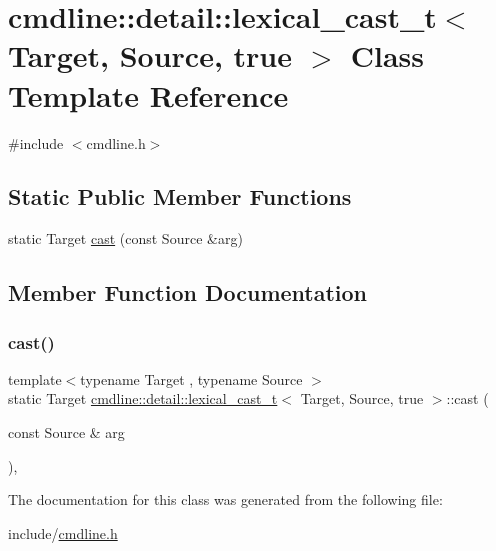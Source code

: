 \hypertarget{classcmdline_1_1detail_1_1lexical__cast__t_3_01_target_00_01_source_00_01true_01_4}{}\section{cmdline\+::detail\+::lexical\+\_\+cast\+\_\+t$<$ Target, Source, true $>$ Class Template Reference}
\label{classcmdline_1_1detail_1_1lexical__cast__t_3_01_target_00_01_source_00_01true_01_4}


{\ttfamily \#include $<$cmdline.\+h$>$}

\subsection*{Static Public Member Functions}
\begin{DoxyCompactItemize}
\item 
static Target \mbox{\hyperlink{classcmdline_1_1detail_1_1lexical__cast__t_3_01_target_00_01_source_00_01true_01_4_a424e3e47b97dde835cdcc3d290618fc5}{cast}} (const Source \&arg)
\end{DoxyCompactItemize}


\subsection{Member Function Documentation}
\mbox{\label{classcmdline_1_1detail_1_1lexical__cast__t_3_01_target_00_01_source_00_01true_01_4_a424e3e47b97dde835cdcc3d290618fc5}} 
\subsubsection{\texorpdfstring{cast()}{cast()}}
{\footnotesize\ttfamily template$<$typename Target , typename Source $>$ \\
static Target \mbox{\hyperlink{classcmdline_1_1detail_1_1lexical__cast__t}{cmdline\+::detail\+::lexical\+\_\+cast\+\_\+t}}$<$ Target, Source, true $>$\+::cast (\begin{DoxyParamCaption}\item[{const Source \&}]{arg }\end{DoxyParamCaption})\hspace{0.3cm}{\ttfamily [inline]}, {\ttfamily [static]}}



The documentation for this class was generated from the following file\+:\begin{DoxyCompactItemize}
\item 
include/\mbox{\hyperlink{cmdline_8h}{cmdline.\+h}}\end{DoxyCompactItemize}
